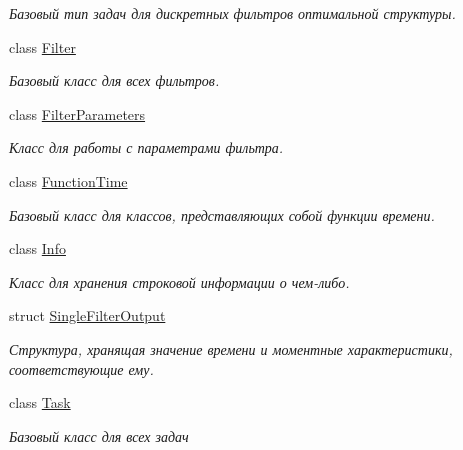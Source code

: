 \begin{DoxyCompactItemize}
\begin{DoxyCompactList}\small\item\em Базовый тип задач для дискретных фильтров оптимальной структуры. \end{DoxyCompactList}\item 
class \hyperlink{class_core_1_1_filter}{Filter}
\begin{DoxyCompactList}\small\item\em Базовый класс для всех фильтров. \end{DoxyCompactList}\item 
class \hyperlink{class_core_1_1_filter_parameters}{Filter\+Parameters}
\begin{DoxyCompactList}\small\item\em Класс для работы с параметрами фильтра. \end{DoxyCompactList}\item 
class \hyperlink{class_core_1_1_function_time}{Function\+Time}
\begin{DoxyCompactList}\small\item\em Базовый класс для классов, представляющих собой функции времени. \end{DoxyCompactList}\item 
class \hyperlink{class_core_1_1_info}{Info}
\begin{DoxyCompactList}\small\item\em Класс для хранения строковой информации о чем-\/либо. \end{DoxyCompactList}\item 
struct \hyperlink{struct_core_1_1_single_filter_output}{Single\+Filter\+Output}
\begin{DoxyCompactList}\small\item\em Структура, хранящая значение времени и моментные характеристики, соответствующие ему. \end{DoxyCompactList}\item 
class \hyperlink{class_core_1_1_task}{Task}
\begin{DoxyCompactList}\small\item\em Базовый класс для всех задач \end{DoxyCompactList}\end{DoxyCompactItemize}
